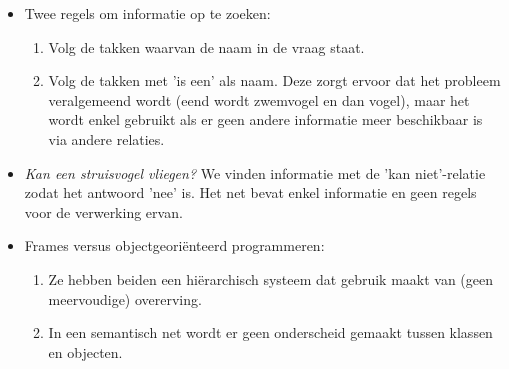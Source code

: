 \begin{itemize}
\begin{itemize}
	\end{itemize}
	\item Twee regels om informatie op te zoeken:
	\begin{enumerate}
		\item Volg de takken waarvan de naam in de vraag staat.
		\item Volg de takken met 'is een' als naam. Deze zorgt ervoor dat het probleem veralgemeend wordt (eend wordt zwemvogel en dan vogel), maar het wordt enkel gebruikt als er geen andere informatie meer beschikbaar is via andere relaties.
	\end{enumerate}
	\item \textit{Kan een struisvogel vliegen?}  We vinden informatie met de 'kan niet'-relatie zodat het antwoord 'nee' is. 
	\alert Het net bevat enkel informatie en geen regels voor de verwerking ervan.
	\item Frames versus objectgeoriënteerd programmeren:
	\begin{enumerate}
		\item Ze hebben beiden een hiërarchisch systeem dat gebruik maakt van (geen meervoudige) overerving.
		\item In een semantisch net wordt er geen onderscheid gemaakt tussen klassen en objecten.
	\end{enumerate}
	
\end{itemize}